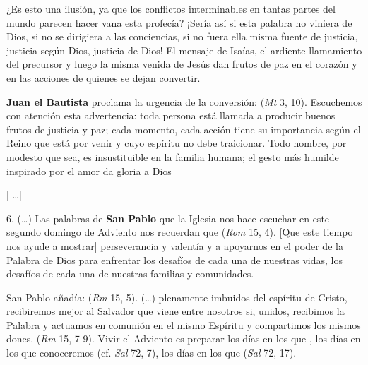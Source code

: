 \begin{body}
\begin{body}
		¿Es esto una ilusión, ya que los conflictos interminables en tantas partes del mundo parecen hacer vana esta profecía? ¡Sería así si esta palabra no viniera de Dios, si no se dirigiera a las conciencias, si no fuera ella misma fuente de justicia, justicia según Dios, justicia de Dios! El mensaje de Isaías, el ardiente llamamiento del precursor y luego la misma venida de Jesús dan frutos de paz en el corazón y en las acciones de quienes se dejan convertir.

		\textbf{Juan el Bautista} proclama la urgencia de la conversión:  (\emph{Mt} 3, 10). Escuchemos con atención esta advertencia: toda persona está llamada a producir buenos frutos de justicia y paz; cada momento, cada acción tiene su importancia según el Reino que está por venir y cuyo espíritu no debe traicionar. Todo hombre, por modesto que sea, es insustituible en la familia humana; el gesto más humilde inspirado por el amor da gloria a Dios

		{[} \ldots{}{]}

		6. (\ldots{}) Las palabras de \textbf{San Pablo} que la Iglesia nos hace escuchar en este segundo domingo de Adviento nos recuerdan que  (\emph{Rom} 15, 4). {[}Que este tiempo nos ayude a mostrar{]} perseverancia y valentía y a apoyarnos en el poder de la Palabra de Dios para enfrentar los desafíos de cada una de nuestras vidas, los desafíos de cada una de nuestras familias y comunidades.

		San Pablo añadía:  (\emph{Rm} 15, 5). (\ldots{}) plenamente imbuidos del espíritu de Cristo, recibiremos mejor al Salvador que viene entre nosotros si, unidos, recibimos la Palabra y actuamos en comunión en el mismo Espíritu y compartimos los mismos dones.  (\emph{Rm} 15, 7-9). Vivir el Adviento es preparar los días en los que , los días en los que conoceremos  (cf. \emph{Sal} 72, 7), los días en los que  (\emph{Sal} 72, 17).


\end{body}
\end{body}
